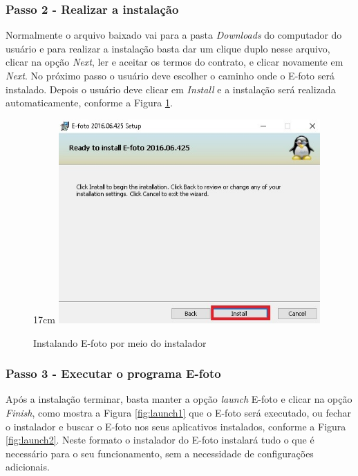 \subsubsection{Passo 2 - Realizar a instalação} %
Normalmente o arquivo baixado vai para a pasta \textit{Downloads} do computador do usuário e para realizar a instalação basta dar um clique duplo nesse arquivo, clicar na opção \textit{Next}, ler e aceitar os termos do contrato, e clicar novamente em \textit{Next}.  No próximo passo o usuário deve escolher o caminho onde o E-foto será instalado. Depois o usuário deve clicar em \textit{Install} e a instalação será realizada automaticamente, conforme a Figura \ref{fig:installmsi}.
 
\begin{figure}[!ht]{17cm}
   \centering
   \includegraphics[width=10cm]{Figuras/installmsi.jpg}
   \caption{Instalando E-foto por meio do instalador} \label{fig:installmsi}
\end{figure}
  
\subsubsection{Passo 3 - Executar o programa E-foto}
Após a instalação terminar, basta manter a opção \textit{launch} E-foto e clicar na opção \textit{Finish}, como mostra a Figura \ref{fig:launch1} que o E-foto será executado, ou fechar o instalador e buscar o E-foto nos seus aplicativos instalados, conforme a Figura \ref{fig:launch2}. Neste formato o instalador do E-foto instalará tudo o que é necessário para o seu funcionamento, sem a necessidade de configurações adicionais.

